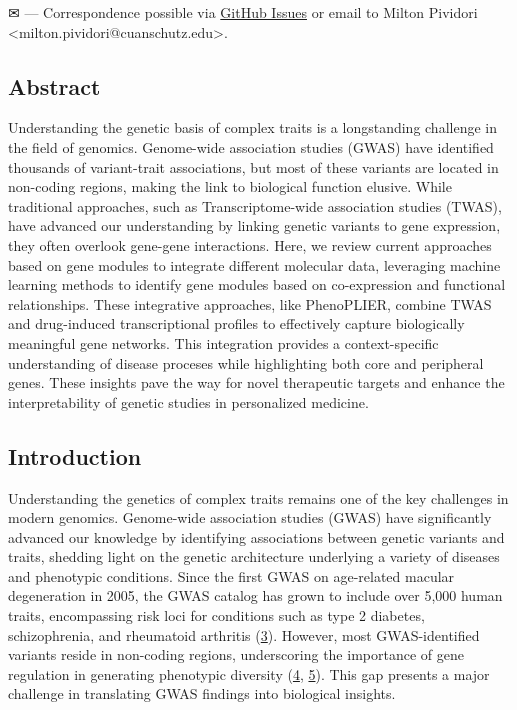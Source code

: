 \leavevmode{}%
✉ --- Correspondence possible via \href{https://github.com/pivlab/annual_review_of_biomedical_data_science/issues}{GitHub Issues}
or email to
Milton Pividori \textless milton.pividori@cuanschutz.edu\textgreater.

\hypertarget{abstract}{%
\subsection{Abstract}\label{abstract}}

Understanding the genetic basis of complex traits is a longstanding challenge in the field of genomics.
Genome-wide association studies (GWAS) have identified thousands of variant-trait associations, but most of these variants are located in non-coding regions, making the link to biological function elusive.
While traditional approaches, such as Transcriptome-wide association studies (TWAS), have advanced our understanding by linking genetic variants to gene expression, they often overlook gene-gene interactions.
Here, we review current approaches based on gene modules to integrate different molecular data, leveraging machine learning methods to identify gene modules based on co-expression and functional relationships.
These integrative approaches, like PhenoPLIER, combine TWAS and drug-induced transcriptional profiles to effectively capture biologically meaningful gene networks.
This integration provides a context-specific understanding of disease proceses while highlighting both core and peripheral genes.
These insights pave the way for novel therapeutic targets and enhance the interpretability of genetic studies in personalized medicine.

\hypertarget{introduction}{%
\subsection{Introduction}\label{introduction}}

Understanding the genetics of complex traits remains one of the key challenges in modern genomics.
Genome-wide association studies (GWAS) have significantly advanced our knowledge by identifying associations between genetic variants and traits, shedding light on the genetic architecture underlying a variety of diseases and phenotypic conditions.
Since the first GWAS on age-related macular degeneration in 2005, the GWAS catalog has grown to include over 5,000 human traits, encompassing risk loci for conditions such as type 2 diabetes, schizophrenia, and rheumatoid arthritis (\protect\hyperlink{ref-HicyXvA4}{3}).
However, most GWAS-identified variants reside in non-coding regions, underscoring the importance of gene regulation in generating phenotypic diversity (\protect\hyperlink{ref-BqjxxhyF}{4}, \protect\hyperlink{ref-9Pr9idng}{5}).
This gap presents a major challenge in translating GWAS findings into biological insights.

